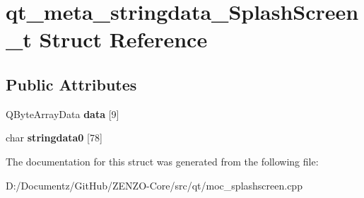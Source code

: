\hypertarget{structqt__meta__stringdata___splash_screen__t}{}\section{qt\+\_\+meta\+\_\+stringdata\+\_\+\+Splash\+Screen\+\_\+t Struct Reference}
\label{structqt__meta__stringdata___splash_screen__t}
\subsection*{Public Attributes}
\begin{DoxyCompactItemize}
\item 
\mbox{\label{structqt__meta__stringdata___splash_screen__t_a02a47dd2db931abe3bb40207484081bd}} 
Q\+Byte\+Array\+Data {\bfseries data} \mbox{[}9\mbox{]}
\item 
\mbox{\label{structqt__meta__stringdata___splash_screen__t_a890f0ba8eb65cd5901cf435c1f9d9579}} 
char {\bfseries stringdata0} \mbox{[}78\mbox{]}
\end{DoxyCompactItemize}


The documentation for this struct was generated from the following file\+:\begin{DoxyCompactItemize}
\item 
D\+:/\+Documentz/\+Git\+Hub/\+Z\+E\+N\+Z\+O-\/\+Core/src/qt/moc\+\_\+splashscreen.\+cpp\end{DoxyCompactItemize}
